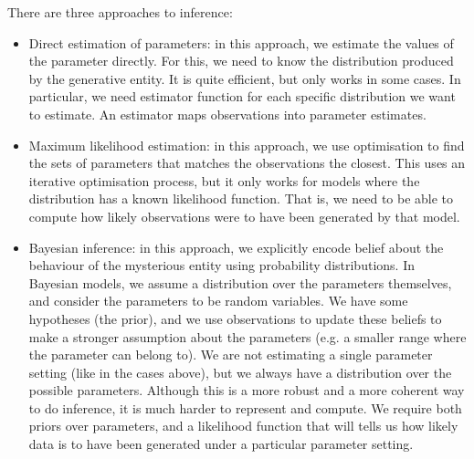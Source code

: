 \documentclass[a4paper, openany]{memoir}
\begin{document}
There are three approaches to inference:
\begin{itemize}
    \item Direct estimation of parameters: in this approach, we estimate the values of the parameter directly. For this, we need to know the distribution produced by the generative entity. It is quite efficient, but only works in some cases. In particular, we need estimator function for each specific distribution we want to estimate. An estimator maps observations into parameter estimates.
    \item Maximum likelihood estimation: in this approach, we use optimisation to find the sets of parameters that matches the observations the closest. This uses an iterative optimisation process, but it only works for models where the distribution has a known likelihood function. That is, we need to be able to compute how likely observations were to have been generated by that model.
    \item Bayesian inference: in this approach, we explicitly encode belief about the behaviour of the mysterious entity using probability distributions. In Bayesian models, we assume a distribution over the parameters themselves, and consider the parameters to be random variables. We have some hypotheses (the prior), and we use observations to update these beliefs to make a stronger assumption about the parameters (e.g. a smaller range where the parameter can belong to). We are not estimating a single parameter setting (like in the cases above), but we always have a distribution over the possible parameters. Although this is a more robust and a more coherent way to do inference, it is much harder to represent and compute. We require both priors over parameters, and a likelihood function that will tells us how likely data is to have been generated under a particular parameter setting.
\end{itemize}
\end{document}
